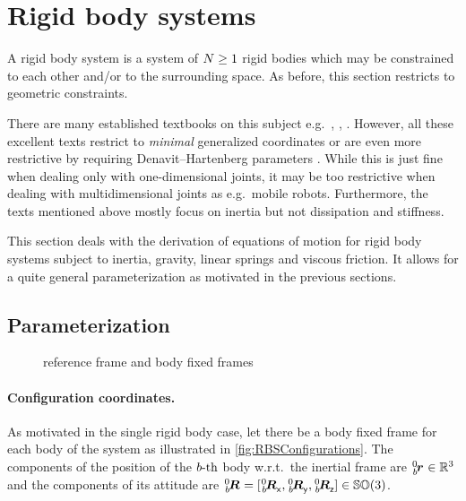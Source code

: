 \section{Rigid body systems}\label{sec:RBSRigidBodySys}
A rigid body system is a system of $N \geq 1$ rigid bodies which may be constrained to each other and/or to the surrounding space.
As before, this section restricts to geometric constraints.

There are many established textbooks on this subject e.g.\ \cite{Schwertassek:MultibodySystems}, \cite{Murray:Robotic}, \cite{Kane:Dynamics}.
However, all these excellent texts restrict to \textit{minimal} generalized coordinates or are even more restrictive by requiring Denavit–Hartenberg parameters \cite{DenavitHartenbergParam}.
While this is just fine when dealing only with one-dimensional joints, it may be too restrictive when dealing with multidimensional joints as e.g.\ mobile robots.
Furthermore, the texts mentioned above mostly focus on inertia but not dissipation and stiffness.

This section deals with the derivation of equations of motion for rigid body systems subject to inertia, gravity, linear springs and viscous friction.
It allows for a quite general parameterization as motivated in the previous sections.

\subsection{Parameterization}\label{sec:RBSParameterization}
\begin{figure}[ht]
 \centering
 
 \caption{reference frame and body fixed frames}
 \label{fig:RBSConfigurations}
\end{figure}

\paragraph{Configuration coordinates.}
As motivated in the single rigid body case, let there be a body fixed frame for each body of the system as illustrated in \autoref{fig:RBSConfigurations}.
The components of the position of the $b\text{-th}$ body w.r.t.\ the inertial frame are $\bodyPos{0}{\BidxII} \in \RealNum^3$ and the components of its attitude are $\bodyRot{0}{\BidxII} = [\bodyRotx{0}{\BidxII}, \bodyRoty{0}{\BidxII}, \bodyRotz{0}{\BidxII}] \in \SpecialOrthogonalGroup(3)$.

